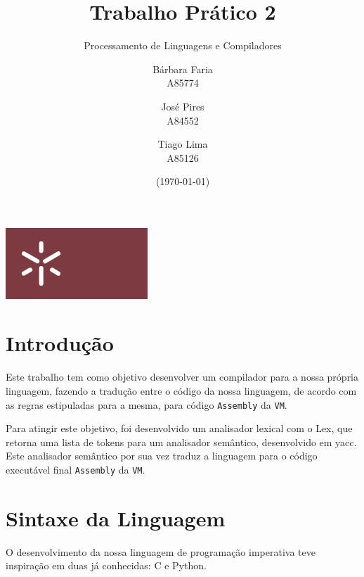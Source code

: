 \documentclass{article}
\title{Trabalho Prático 2} %
\subtitle{Processamento de Linguagens e Compiladores}
\author{Bárbara Faria\\A85774
        \and            
        José Pires\\A84552
        \and 
        Tiago Lima\\A85126} %
\date{ (\today)} %
\begin{document}

\maketitle %

\begin{center}%
\includegraphics[width=0.4\textwidth]{Uminho.jpg} 
\end{center}

\clearpage %

\tableofcontents %
\clearpage %


\section{Introdução} \label{sec:Introdução} %
\setlength{\parindent}{5ex} Este trabalho tem como objetivo desenvolver um compilador para a nossa própria linguagem, fazendo a tradução entre o código da nossa linguagem, de acordo com as regras estipuladas para a mesma, para código {\tt Assembly} da {\tt VM}.
\par Para atingir este objetivo, foi desenvolvido um analisador lexical com o Lex, que retorna uma lista de tokens para um analisador semântico, desenvolvido em yacc. Este analisador semântico por sua vez traduz a linguagem para o código executável final {\tt Assembly} da {\tt VM}.
\clearpage




\section{Sintaxe da Linguagem} \label{sec:Sintaxe da Linguagem}
\setlength{\parindent}{5ex} O desenvolvimento da nossa linguagem de programação imperativa teve inspiração em duas já conhecidas: C e Python.
\end{document}
